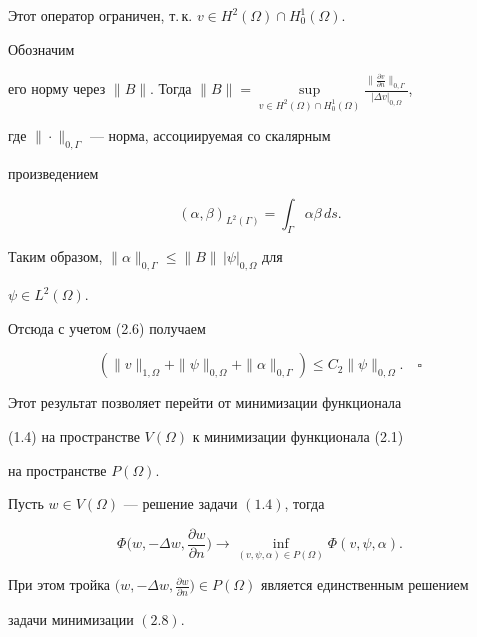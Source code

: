 Этот оператор ограничен, т.\,к. $v\in H^2(\Omega)\cap H^1_0(\Omega)$. 


Обозначим 


его норму через $\|B\|$. Тогда $\|B\|=\sup\limits_{v\in H^2(\Omega)\cap 


H^1_0(\Omega)}\frac{\big\| \frac{\partial v}{\partial 


n}\big\|_{0,\Gamma}}{|\Delta v|_{0,\Omega}}$, 


где $\|\cdot\|_{0,\Gamma}$ --- норма, ассоциируемая со скалярным 


произведением 


$$ 


(\alpha,\beta)_{L^2(\Gamma)}=\int_\Gamma \alpha\beta\,ds. 


$$ 


 


Таким образом, $\|\alpha\|_{0,\Gamma}\le\|B\|\,|\psi|_{0,\Omega}$ для 


$\psi\in L^2(\Omega)$. 


Отсюда с учетом (2.6) получаем 


$$ 


(\|v\|_{1,\Omega}+\|\psi\|_{0,\Omega}+\|\alpha\|_{0,\Gamma})\le 


C_2\|\psi\|_{0,\Omega}.\quad\square 


$$ 


 


Этот результат позволяет перейти от минимизации функционала 


(1.4) на пространстве $V(\Omega)$ к минимизации функционала (2.1) 


на пространстве $P(\Omega)$. 


 


\begin{thm} 


Пусть $w\in V(\Omega)$ --- решение задачи $(1.4)$, тогда 


\begin{equation} 


\Phi\bigg(w,-\Delta w,\frac{\partial w}{\partial n} \bigg)\to 


\inf_{(v,\psi,\alpha)\in P(\Omega)}\Phi(v,\psi,\alpha). 


\end{equation} 


При этом тройка $\big(w,-\Delta w,\frac{\partial w}{\partial n} \big)\in 


P(\Omega)$ является единственным решением 


задачи минимизации $(2.8)$. 


\end{thm} 


